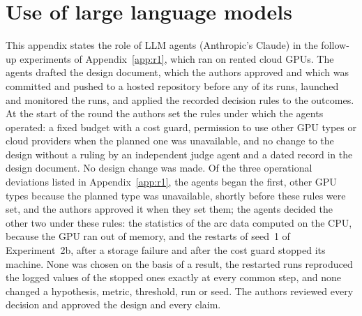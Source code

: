 \section{Use of large language models}
\label{app:llm}
This appendix states the role of LLM agents (Anthropic's Claude) in the follow-up experiments of Appendix~\ref{app:r1}, which ran on rented cloud GPUs. The agents drafted the design document, which the authors approved and which was committed and pushed to a hosted repository before any of its runs, launched and monitored the runs, and applied the recorded decision rules to the outcomes. At the start of the round the authors set the rules under which the agents operated: a fixed budget with a cost guard, permission to use other GPU types or cloud providers when the planned one was unavailable, and no change to the design without a ruling by an independent judge agent and a dated record in the design document. No design change was made. Of the three operational deviations listed in Appendix~\ref{app:r1}, the agents began the first, other GPU types because the planned type was unavailable, shortly before these rules were set, and the authors approved it when they set them; the agents decided the other two under these rules: the statistics of the arc data computed on the CPU, because the GPU ran out of memory, and the restarts of seed~1 of Experiment~2b, after a storage failure and after the cost guard stopped its machine. None was chosen on the basis of a result, the restarted runs reproduced the logged values of the stopped ones exactly at every common step, and none changed a hypothesis, metric, threshold, run or seed. The authors reviewed every decision and approved the design and every claim.
